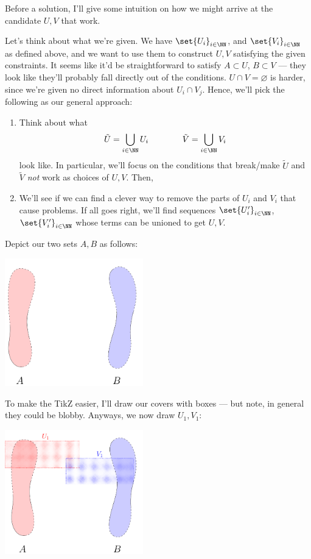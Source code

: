 \documentclass{fkpset}
\begin{document}
  \begin{leftbar}
    Before a solution, I'll give some intuition on how we might arrive
    at the candidate $U,V$ that work.

    Let's think about what we're given. We have $\set{U_i}_{i \in
      \NN}$, and $\set{V_i}_{i \in \NN}$ as defined above, and we want
    to use them to construct $U,V$ satisfying the given constraints.
    It seems like it'd be straightforward to satisfy $A \subset U$, $B
    \subset V$ --- they look like they'll probably fall directly out
    of the conditions. $U \cap V = \varnothing$ is harder, since we're
    given no direct information about $U_i \cap V_j$. Hence, we'll
    pick the following as our general approach:
    \begin{enumerate}[label=(\arabic*)]
      \item Think about what
        \[
          \tilde U = \bigcup_{i \in \NN} U_i \qquad\qquad \tilde V =
          \bigcup_{i \in \NN} V_i
        \]
        look like. In particular, we'll focus on the conditions that
        break/make $\tilde U$ and $\tilde V$ \emph{not} work as
        choices of $U,V$. Then,
      \item We'll see if we can find a clever way to remove the parts
        of $U_i$ and $V_i$ that cause problems. If all goes right,
        we'll find sequences $\set{U'_i}_{i\in\NN}$,
        $\set{V'_i}_{i\in\NN}$ whose terms can be unioned to get
        $U,V$.
    \end{enumerate}
    Depict our two sets $A,B$ as
    follows:
    \begin{center}
      \includegraphics[keepaspectratio,width=6cm]{figures/5-29-AB}
    \end{center}
    To make the TikZ easier, I'll draw our covers with boxes --- but
    note, in general they could be blobby. Anyways, we now draw
    $U_1, V_1$:
    \begin{center}
      \includegraphics[keepaspectratio,width=6cm]{figures/5-29-n=1}

\end{center}
\end{leftbar}
\end{document}
